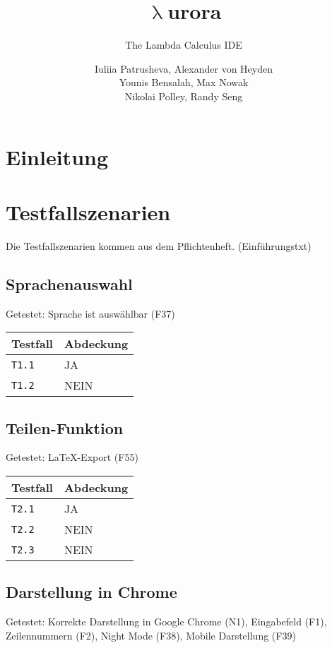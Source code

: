 \documentclass[parskip=full,11pt,twoside]{scrartcl}
\title{\textbf{$\uplambda$}urora}
\subtitle{The Lambda Calculus IDE}
\author{Iuliia Patrusheva, Alexander von Heyden\\
    Younis Bensalah, Max Nowak\\
    Nikolai Polley, Randy Seng}
\begin{document}
    \maketitle
    \tableofcontents
    \newpage

    \section{Einleitung}


    \section{Testfallszenarien}
    Die Testfallszenarien kommen aus dem Pflichtenheft. (Einführungstxt)
    
    \subsection{Sprachenauswahl}
    Getestet: Sprache ist auswählbar (F37)

	\label{shortcuts}
	\begin{center}
		\begin{tabular}{ p{9cm} p{4cm}}
    			Testfall & Abdeckung \\ \hline
    			\texttt{T1.1} & \cellcolor{green!20}JA \\ \hline
    			\texttt{T1.2} & \cellcolor{red!20}NEIN \\ \hline
		\end{tabular}
	\end{center}
	
	\subsection{Teilen-Funktion}
    Getestet: LaTeX-Export (F55)

	\label{shortcuts}
	\begin{center}
		\begin{tabular}{ p{9cm} p{4cm}}
    			Testfall & Abdeckung \\ \hline
    			\texttt{T2.1} & \cellcolor{green!20}JA \\ \hline
    			\texttt{T2.2} & \cellcolor{red!20}NEIN \\ \hline
			\texttt{T2.3} & \cellcolor{red!20}NEIN \\ \hline
		\end{tabular}
	\end{center}

	\subsection{Darstellung in Chrome}
    Getestet: Korrekte Darstellung in Google Chrome (N1), Eingabefeld (F1), Zeilennummern (F2), Night Mode (F38), Mobile Darstellung (F39)
\end{document}
